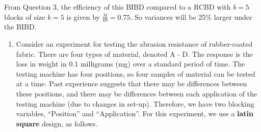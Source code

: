 \documentclass[
]{book}
\theoremstyle{definition}
\theoremstyle{definition}
\theoremstyle{definition}
\theoremstyle{definition}
\theoremstyle{remark}
\begin{document}
From Question 3, the efficiency of this BIBD compared to a RCBD with \(b=5\) blocks of size \(k=5\) is given by \(\frac{\lambda t}{kb} = 0.75\). So variances will be 25\% larger under the BIBD.

\begin{enumerate}
\def\labelenumi{\arabic{enumi}.}
\setcounter{enumi}{4}
\item
  Consider an experiment for testing the abrasion resistance of rubber-coated fabric. There are four types of material, denoted A - D. The response is the loss in weight in 0.1 milligrams (mg) over a standard period of time. The testing machine has four positions, so four samples of material can be tested at a time. Past experience suggests that there may be differences between these positions, and there may be differences between each application of the testing machine (due to changes in set-up). Therefore, we have two blocking variables, ``Position'' and ``Application''. For this experiment, we use a \textbf{latin square} design, as follows.


\end{enumerate}
\end{document}
